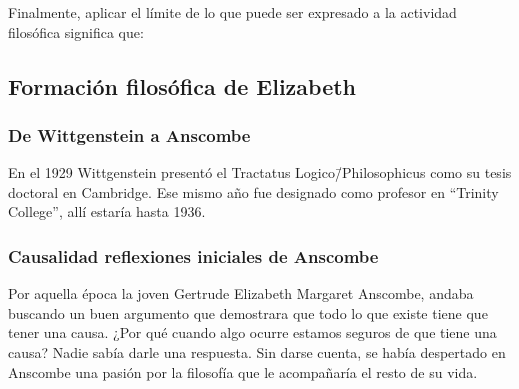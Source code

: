         Finalmente, aplicar el límite de lo que puede ser expresado a la actividad
        filosófica significa que:

        \subsection{Formación filosófica de Elizabeth}
        \subsubsection{De Wittgenstein a Anscombe}
        En el 1929 Wittgenstein presentó el Tractatus Logico\=/Philosophicus como su
        tesis doctoral en Cambridge. Ese mismo año fue designado como profesor en
        ``Trinity College'', allí estaría hasta 1936.

        \subsubsection{Causalidad reflexiones iniciales de Anscombe}
        Por aquella época la joven Gertrude Elizabeth Margaret Anscombe, andaba buscando
        un buen argumento que demostrara que todo lo que existe tiene que tener una
        causa. ¿Por qué cuando algo ocurre estamos seguros de que tiene una causa? Nadie
        sabía darle una respuesta. Sin darse cuenta, se había despertado en Anscombe
        una pasión por la filosofía que le acompañaría el resto de su vida.

